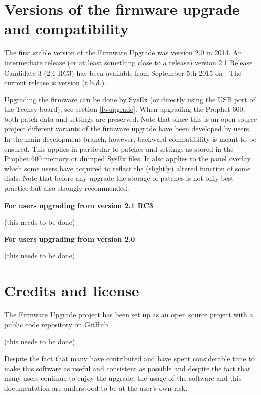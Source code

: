 \documentclass[landscape, 11pt, oneside]{report}
\newenvironment{flowtext}{\addmargin[0cm]{7cm}}{\endaddmargin} %
\begin{document}
\begin{flowtext}
\section{Versions of the firmware upgrade and compatibility}

The first stable version of the Firmware Upgrade was version 2.0 \cite{versiontwo} in 2014. An intermediate release (or at least something close to a release) version 2.1 Release Candidate 3 (2.1 RC3) has been available from September 5th 2015 on \cite{gligli}. The current release is version (t.b.d.). 

Upgrading the firmware can be done by SysEx (or directly using the USB port of the Teensy board), see section \ref{fwupgrade}. When upgrading the Prophet 600, both patch data and settings are preserved. Note that since this is an open source project different variants of the firmware upgrade have been developed by users. In the main development branch, however, backward compatibility is meant to be ensured. This applies in particular to patches and settings as stored in the Prophet 600 memory or dumped SysEx files. It also applies to the panel overlay which some users have acquired to reflect the (slightly) altered function of some dials. Note that before any upgrade the storage of patches is not only best practice but also strongly recommended.  

\textbf{For users upgrading from version 2.1 RC3}

(this needs to be done)

\textbf{For users upgrading from version 2.0}

(this needs to be done)

\section{Credits and license}

The Firmware Upgrade project has been set up as an open source project with a public code repository on GitHub\cite{repository}. 

(this needs to be done)

Despite the fact that many have contributed and have spent considerable time to make this software as useful and consistent as possible and despite the fact that many users continue to enjoy the upgrade, the usage of the software and this documentation are understood to be at the user's own risk.


\end{flowtext}
\end{document}
